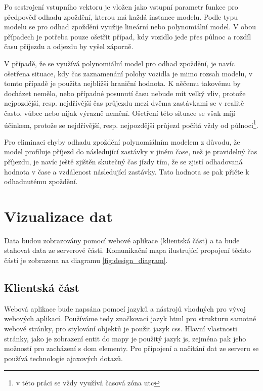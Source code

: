\bigbreak


Po sestrojení vstupního vektoru je vložen jako vstupní parametr funkce pro předpověď odhadu zpoždění, kterou má každá instance modelu. Podle typu modelu se pro odhad zpoždění využije lineární nebo polynomiální model. V obou případech je potřeba pouze ošetřit případ, kdy vozidlo jede přes půlnoc a rozdíl času příjezdu a odjezdu by vyšel záporně.


\bigbreak


V případě, že se využívá polynomiální model pro odhad zpoždění, je navíc ošetřena situace, kdy čas zaznamenání polohy vozidla je mimo rozsah modelu, v tomto případě je použita nejbližší hraniční hodnota. K něčemu takovému by docházet nemělo, nebo případné posunutí času nebude mít velký vliv, protože nejpozdější, resp. nejdřívější čas průjezdu mezi dvěma zastávkami se v realitě často, vůbec nebo nijak výrazně nemění. Ošetření této situace se však míjí účinkem, protože se nejdřívější, resp. nejpozdější průjezd počítá vždy od půlnoci\footnote{v této práci se vždy využívá časová zóna \gls{utc}}.


\bigbreak


Pro eliminaci chyby odhadu zpoždění polynomiálním modelem z důvodu, že model profiluje příjezd do následující zastávky v jiném čase, než je pravidelný čas příjezdu, je navíc ještě zjištěn skutečný čas jízdy tím, že se zjistí odhadovaná hodnota v čase a vzdálenost následující zastávky. Tato hodnota se pak přičte k odhadnutému zpoždění.


\section{Vizualizace dat}


Data budou zobrazovány pomocí webové aplikace (klientská část) a ta bude stahovat data ze serverové části. Komunikační mapa ilustrující propojení těchto částí je zobrazena na diagramu \ref{fig:design_diagram}.


\subsection{Klientská část}


Webová aplikace bude napsána pomocí jazyků a nástrojů vhodných pro vývoj webových aplikací. Používáme tedy značkovací jazyk \gls{html} pro strukturu samotné webové stránky, pro stylování objektů je použit jazyk \gls{css}. Hlavní vlastnosti stránky, jako je zobrazení entit do mapy je použitý jazyk \gls{js}, zejména pak jeho možností pro zacházení s \gls{dom} elementy. Pro připojení a načítání dat ze serveru se používá technologie \gls{ajax}ových dotazů.


